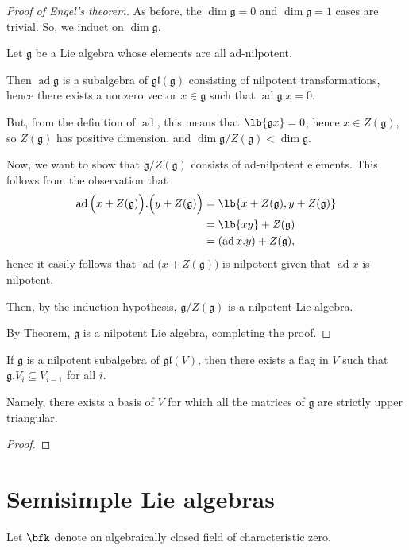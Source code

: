 \documentclass{article}
\DeclarePairedDelimiter\lb\lbrack\rbrack
\DeclareMathOperator{\ad}{ad}
\newcommand*\frkg{{\ensuremath{\mathfrak{g}}}}
\newcommand*\glalg{\ensuremath{\mathfrak{gl}}}
\newcommand*\acts{.}
\begin{document}
\begin{proof}[Proof of Engel's theorem]
    As before, the $\dim \frkg = 0$ and $\dim \frkg = 1$ cases are trivial.
    So, we induct on $\dim \frkg$.

    Let $\frkg$ be a Lie algebra whose elements are all ad-nilpotent.

    Then $\ad \frkg$ is a subalgebra of $\glalg(\frkg)$ consisting of nilpotent transformations, hence there exists a nonzero vector $x \in \frkg$ such that $\ad \frkg \acts x = 0$.

    But, from the definition of $\ad$, this means that $\lb{\frkg x} = 0$, hence $x \in Z(\frkg)$, so $Z(\frkg)$ has positive dimension, and $\dim \frkg / Z(\frkg) < \dim \frkg$.

    Now, we want to show that $\frkg/Z(\frkg)$ consists of ad-nilpotent elements.
    This follows from the observation that
    \begin{align*}
        \ad \Big(x + Z(\frkg)\Big) \acts \Big(y + Z(\frkg)\Big)
        &= 
        \lb{x + Z(\frkg), y + Z(\frkg)} 
        \\
        &= \lb{xy} + Z(\frkg) 
        \\
        &= (\ad x \acts y) + Z(\frkg),
    \end{align*}
    hence it easily follows that $\ad \Big(x + Z(\frkg)\Big)$ is nilpotent given that $\ad x$ is nilpotent.
    
    Then, by the induction hypothesis, $\frkg/Z(\frkg)$ is a nilpotent Lie algebra.

    By Theorem, $\frkg$ is a nilpotent Lie algebra, completing the proof.
\end{proof}

\begin{corollary}
    If $\frkg$ is a nilpotent subalgebra of $\glalg(V)$, then there exists a flag in $V$ such that $\frkg \acts V_i \subseteq V_{i-1}$ for all $i$.

    Namely, there exists a basis of $V$ for which all the matrices of $\frkg$ are strictly upper triangular.
\end{corollary}

\begin{proof}
\end{proof}

\section{Semisimple Lie algebras}

\begin{convention}
    Let $\bfk$ denote an algebraically closed field of characteristic zero.
\end{convention}
\end{document}
